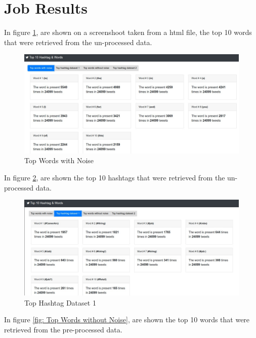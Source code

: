 \documentclass{article}
\newcommand*\setcaptioncitation[1]{\def\captioncitation{\textit{Source:}~#1}}
\let\captioncitation\relax
\begin{document}
        \section{Job Results}
        In figure \ref{fig: Top Words with Noise}, are shown on a screenshoot taken from a html file, the top 10 words that were retrieved from the un-processed data.
		\begin{figure}[H]
            \centering 
            \includegraphics[width=1\linewidth]{./img/topwordswithnoise.jpeg}
            \setcaptioncitation{self-made}
            \caption{Top Words with Noise}
            \label{fig: Top Words with Noise}
        \end{figure}
        In figure \ref{fig: Top Hashtag Dataset 1}, are shown the top 10 hashtags that were retrieved from the un-processed data.
        \begin{figure}[H]
            \centering 
            \includegraphics[width=1\linewidth]{./img/tophashtagdataset1.jpeg}
            \setcaptioncitation{self-made}
            \caption{Top Hashtag Dataset 1}
            \label{fig: Top Hashtag Dataset 1}
        \end{figure}
        In figure \ref{fig: Top Words without Noise}, are shown the top 10 words that were retrieved from the pre-processed data.
\end{document}

